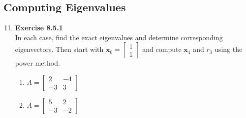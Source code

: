 \documentclass[12pt, a4paper]{scrartcl}
\begin{document}
    \subsection*{Computing Eigenvalues}
        \begin{enumerate}
            \setcounter{enumi}{10}
            \item \textbf{Exercise 8.5.1}\\In each case, find the exact eigenvalues and determine corresponding eigenvectors. Then start with $\textbf{x}_0=\begin{bmatrix}
                1\\1
            \end{bmatrix}$ and compute $\textbf{x}_4$ and $r_3$ using the power method.
            \begin{enumerate}
                \item $A=\begin{bmatrix}
                    2&-4\\-3&3
                \end{bmatrix}$

                \item $A=\begin{bmatrix}
                    5&2\\-3&-2
                \end{bmatrix}$

            \end{enumerate}
        \end{enumerate}
\end{document}
